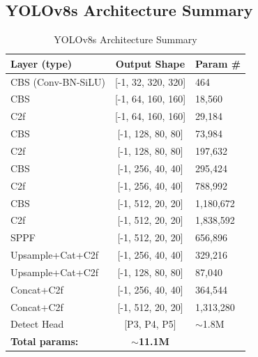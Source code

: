 \documentclass[runningheads]{llncs}
\begin{document}
\subsection{YOLOv8s Architecture Summary}
\begin{table}[H]
\caption{YOLOv8s Architecture Summary}
\centering
\begin{tabular}{lcl}
\toprule
\textbf{Layer (type)} & \textbf{Output Shape} & \textbf{Param \#} \\
\midrule
CBS (Conv-BN-SiLU) & [-1, 32, 320, 320] & 464 \\
CBS & [-1, 64, 160, 160] & 18,560 \\
C2f & [-1, 64, 160, 160] & 29,184 \\
CBS & [-1, 128, 80, 80] & 73,984 \\
C2f & [-1, 128, 80, 80] & 197,632 \\
CBS & [-1, 256, 40, 40] & 295,424 \\
C2f & [-1, 256, 40, 40] & 788,992 \\
CBS & [-1, 512, 20, 20] & 1,180,672 \\
C2f & [-1, 512, 20, 20] & 1,838,592 \\
SPPF & [-1, 512, 20, 20] & 656,896 \\
Upsample+Cat+C2f & [-1, 256, 40, 40] & 329,216 \\
Upsample+Cat+C2f & [-1, 128, 80, 80] & 87,040 \\
Concat+C2f & [-1, 256, 40, 40] & 364,544 \\
Concat+C2f & [-1, 512, 20, 20] & 1,313,280 \\
Detect Head & [P3, P4, P5] & $\sim$1.8M \\
\midrule
\textbf{Total params:} & \textbf{$\sim$11.1M} & \\
\bottomrule
\end{tabular}
\end{table}
\end{document}

